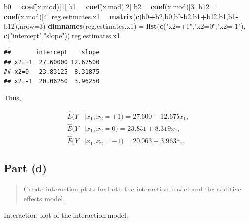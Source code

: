\documentclass[
]{article}
\newenvironment{Shaded}{\begin{snugshade}}{\end{snugshade}}
\newcommand{\AttributeTok}[1]{\textcolor[rgb]{0.13,0.29,0.53}{#1}}
\newcommand{\DecValTok}[1]{\textcolor[rgb]{0.00,0.00,0.81}{#1}}
\newcommand{\FunctionTok}[1]{\textcolor[rgb]{0.13,0.29,0.53}{\textbf{#1}}}
\newcommand{\NormalTok}[1]{#1}
\newcommand{\OtherTok}[1]{\textcolor[rgb]{0.56,0.35,0.01}{#1}}
\newcommand{\SpecialCharTok}[1]{\textcolor[rgb]{0.81,0.36,0.00}{\textbf{#1}}}
\newcommand{\StringTok}[1]{\textcolor[rgb]{0.31,0.60,0.02}{#1}}
\begin{document}
\begin{Shaded}
\begin{Highlighting}[]
\NormalTok{b0 }\OtherTok{=} \FunctionTok{coef}\NormalTok{(x.mod)[}\DecValTok{1}\NormalTok{]}
\NormalTok{b1 }\OtherTok{=} \FunctionTok{coef}\NormalTok{(x.mod)[}\DecValTok{2}\NormalTok{]}
\NormalTok{b2 }\OtherTok{=} \FunctionTok{coef}\NormalTok{(x.mod)[}\DecValTok{3}\NormalTok{]}
\NormalTok{b12 }\OtherTok{=} \FunctionTok{coef}\NormalTok{(x.mod)[}\DecValTok{4}\NormalTok{]}
\NormalTok{reg.estimates.x1 }\OtherTok{=} \FunctionTok{matrix}\NormalTok{(}\FunctionTok{c}\NormalTok{(b0}\SpecialCharTok{+}\NormalTok{b2,b0,b0}\SpecialCharTok{{-}}\NormalTok{b2,b1}\SpecialCharTok{+}\NormalTok{b12,b1,b1}\SpecialCharTok{{-}}\NormalTok{b12),}\AttributeTok{nrow=}\DecValTok{3}\NormalTok{)}
\FunctionTok{dimnames}\NormalTok{(reg.estimates.x1) }\OtherTok{=} \FunctionTok{list}\NormalTok{(}\FunctionTok{c}\NormalTok{(}\StringTok{"x2=+1"}\NormalTok{,}\StringTok{"x2=0"}\NormalTok{,}\StringTok{"x2={-}1"}\NormalTok{),}
                                  \FunctionTok{c}\NormalTok{(}\StringTok{"intercept"}\NormalTok{,}\StringTok{"slope"}\NormalTok{))}
\NormalTok{reg.estimates.x1}
\end{Highlighting}
\end{Shaded}

\begin{verbatim}
##       intercept    slope
## x2=+1  27.60000 12.67500
## x2=0   23.83125  8.31875
## x2=-1  20.06250  3.96250
\end{verbatim}

Thus,

\begin{align*}
\hat{E}(Y&|x_1,x_2=+1)  = 27.600 + 12.675 x_1,\\
\hat{E}(Y&|x_1,x_2=0)  = 23.831 + 8.319 x_1,\\
\hat{E}(Y&|x_1,x_2=-1) = 20.063 + 3.963 x_1.
\end{align*}

\hypertarget{part-d}{%
\subsection{Part (d)}\label{part-d}}

\begin{quote}
Create interaction plots for both the interaction model and the additive
effects model.
\end{quote}

Interaction plot of the interaction model:
\end{document}
